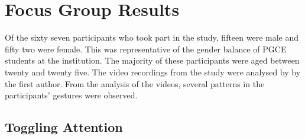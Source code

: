 \documentclass[manuscript, review, screen]{acmart}
\begin{document}



\section{Focus Group Results}
\label{sec:focusgroupresults}  

Of the sixty seven participants who took part in the study, fifteen were male and fifty two were female.
This was representative of the gender balance of \ac{PGCE} students at the institution.
The majority of these participants were aged between twenty and twenty five.
The video recordings from the study were analysed by by the first author.
From the analysis of the videos, several patterns in the participants' gestures were observed.

\subsection{Toggling Attention}
\end{document}
